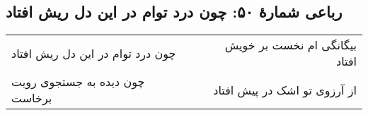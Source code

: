 \begin{center}
\section*{رباعی شمارهٔ ۵۰: چون درد توام در این دل ریش افتاد}
\label{sec:050}
\begin{longtable}{l p{0.5cm} r}
چون درد توام در این دل ریش افتاد
&&
بیگانگی ام نخست بر خویش افتاد
\\
چون دیده به جستجوی رویت برخاست
&&
از آرزوی تو اشک در پیش افتاد
\\
\end{longtable}
\end{center}
